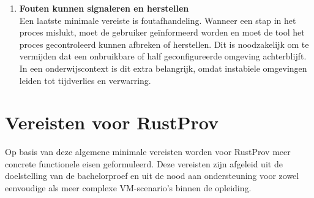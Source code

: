 \begin{enumerate}
    \item \textbf{Fouten kunnen signaleren en herstellen}\\
    Een laatste minimale vereiste is foutafhandeling. Wanneer een stap in het proces mislukt, moet de gebruiker geïnformeerd worden en moet de tool het proces gecontroleerd kunnen afbreken of herstellen. Dit is noodzakelijk om te vermijden dat een onbruikbare of half geconfigureerde omgeving achterblijft. In een onderwijscontext is dit extra belangrijk, omdat instabiele omgevingen leiden tot tijdverlies en verwarring.
\end{enumerate}

\section{Vereisten voor RustProv}
Op basis van deze algemene minimale vereisten worden voor RustProv meer concrete functionele eisen geformuleerd. Deze vereisten zijn afgeleid uit de doelstelling van de bachelorproef en uit de nood aan ondersteuning voor zowel eenvoudige als meer complexe VM-scenario’s binnen de opleiding.

